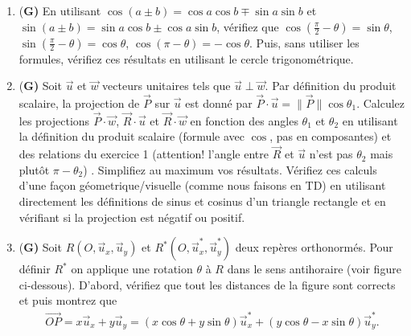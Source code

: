 \documentclass[french,12pt]{article}
\def\L{3.1}     %
\begin{document}
\begin{enumerate}

\item {(\bf G)} En utilisant $\cos(a \pm b) = \cos a \cos b \mp \sin a \sin b$ et $\sin(a \pm b) = \sin a \cos b \pm \cos a \sin b$, vérifiez que $\cos(\frac{\pi}{2} - \theta) = \sin \theta$, $\sin(\frac{\pi}{2} - \theta) = \cos \theta$, $\cos(\pi - \theta) = -\cos \theta$. Puis, sans utiliser les formules, vérifiez ces résultats en utilisant le cercle trigonométrique.



\item {(\bf G)} Soit $\vec{u}$ et $\vec{w}$ vecteurs unitaires tels que $\vec{u} \perp \vec{w}$. Par définition du produit scalaire, la projection de $\vec{P}$ sur $\vec{u}$ est donné par $\vec{P} \cdot \vec{u} = \| \vec{P} \| \cos \theta_1$. Calculez les projections $\vec{P} \cdot \vec{w}$, $\vec{R} \cdot \vec{u}$ et $\vec{R} \cdot \vec{w}$ en fonction des angles $\theta_1$ et $\theta_2$ en utilisant la définition du produit scalaire (formule avec $\cos$, pas en composantes) et des relations du exercice 1 (attention! l'angle entre $\vec{R}$ et $\vec{u}$ n'est pas $\theta_2$ mais plutôt $\pi - \theta_2$) . Simplifiez au maximum vos résultats. Vérifiez ces calculs d'une façon géometrique/visuelle (comme nous faisons en TD) en utilisant directement les définitions de sinus et cosinus d'un triangle rectangle et en vérifiant si la projection est négatif ou positif.



\item {(\bf G)} Soit $R(O, \vec{u}_x, \vec{u}_y)$ et $R^*(O, \vec{u}_x^*, \vec{u}_y^*)$ deux repères orthonormés. Pour définir $R^*$ on applique une rotation $\theta$ à $R$ dans le sens antihoraire (voir figure ci-dessous). D'abord, vérifiez que tout les distances de la figure sont corrects et puis montrez que
\begin{align} \label{eq:change_basis}
	\vec{OP} = x \vec{u}_x + y \vec{u}_y = (x \cos \theta + y \sin \theta) \vec{u}_x^* + (y \cos \theta - x \sin \theta) \vec{u}_y^*.
\end{align}


\end{enumerate}
\end{document}
